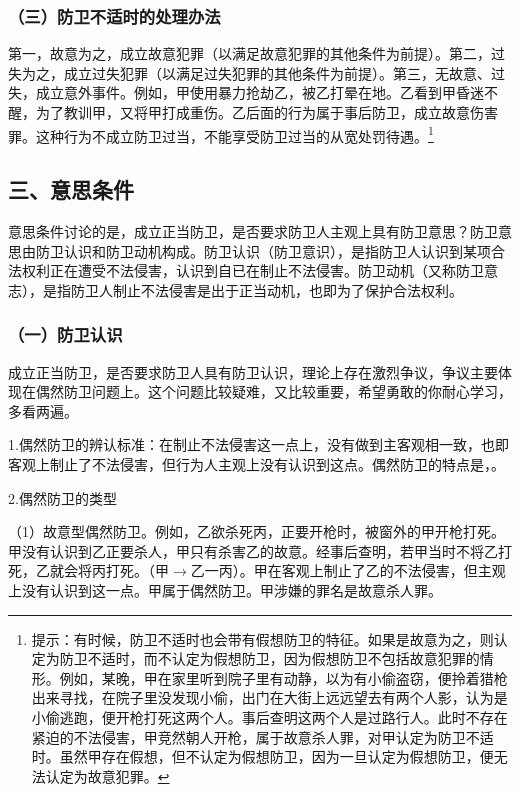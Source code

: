 \subsubsection*{（三）防卫不适时的处理办法}

第一，故意为之，成立故意犯罪（以满足故意犯罪的其他条件为前提）。第二，过失为之，成立过失犯罪（以满足过失犯罪的其他条件为前提）。第三，无故意、过失，成立意外事件。例如，甲使用暴力抢劫乙，被乙打晕在地。乙看到甲昏迷不醒，为了教训甲，又将甲打成重伤。乙后面的行为属于事后防卫，成立故意伤害罪。这种行为不成立防卫过当，不能享受防卫过当的从宽处罚待遇。\footnote{提示：有时候，防卫不适时也会带有假想防卫的特征。如果是故意为之，则认定为防卫不适时，而不认定为假想防卫，因为假想防卫不包括故意犯罪的情形。例如，某晚，甲在家里听到院子里有动静，以为有小偷盗窃，便拎着猎枪出来寻找，在院子里没发现小偷，出门在大街上远远望去有两个人影，认为是小偷逃跑，便开枪打死这两个人。事后查明这两个人是过路行人。此时不存在紧迫的不法侵害，甲竞然朝人开枪，属于故意杀人罪，对甲认定为防卫不适时。虽然甲存在假想，但不认定为假想防卫，因为一旦认定为假想防卫，便无法认定为故意犯罪。}

\subsection*{三、意思条件}

意思条件讨论的是，成立正当防卫，是否要求防卫人主观上具有防卫意思？防卫意思由防卫认识和防卫动机构成。防卫认识（防卫意识），是指防卫人认识到某项合法权利正在遭受不法侵害，认识到自已在制止不法侵害。防卫动机（又称防卫意志），是指防卫人制止不法侵害是出于正当动机，也即为了保护合法权利。

\subsubsection*{（一）防卫认识}

成立正当防卫，是否要求防卫人具有防卫认识，理论上存在激烈争议，争议主要体现在偶然防卫问题上。这个问题比较疑难，又比较重要，希望勇敢的你耐心学习，多看两遍。

1.偶然防卫的辨认标准：在制止不法侵害这一点上，没有做到主客观相一致，也即客观上制止了不法侵害，但行为人主观上没有认识到这点。偶然防卫的特点是，。

2.偶然防卫的类型

（1）故意型偶然防卫。例如，乙欲杀死丙，正要开枪时，被窗外的甲开枪打死。甲没有认识到乙正要杀人，甲只有杀害乙的故意。经事后查明，若甲当时不将乙打死，乙就会将丙打死。（甲\ensuremath{\rightarrow}乙一丙）。甲在客观上制止了乙的不法侵害，但主观上没有认识到这一点。甲属于偶然防卫。甲涉嫌的罪名是故意杀人罪。

